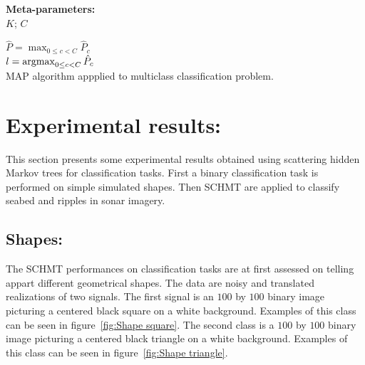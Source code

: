 \documentclass[a4paper,11pt]{report}
\begin{document}
		\begin{center}
			\begin{algorithm}
				\textbf{Meta-parameters:}\\
					$K$; $C$ 
					
				
				$\hat{P}= \max_{0\leq c < C} \hat{P}_{c}$\\
				$l= \mathop{\rm argmax}_{0\leq c < C} \hat{P}_{c}$\\
				
				\caption{MAP algorithm appplied to multiclass classification problem.}
				\label{algo:MAP clf}
			\end{algorithm}        
		\end{center}
    
\chapter{Experimental results:}
  \label{chap:Exp}
  This section presents some experimental results obtained using scattering hidden Markov trees for classification tasks. First a binary classification task is performed on simple simulated shapes. Then SCHMT are applied to classify seabed and ripples in sonar imagery.
  
  \section{Shapes:}
		\label{sec:Exp/Shape:}
		
		The SCHMT performances on classification tasks are at first assessed on telling appart different geometrical shapes. The data are noisy and translated realizations of two signals. The first signal is an $100$ by $100$ binary image picturing a centered black square on a white background. Examples of this class can be seen in figure~\ref{fig:Shape square}. The second class is a $100$ by $100$ binary image picturing a centered black triangle on a white background. Examples of this class can be seen in figure~\ref{fig:Shape triangle}. 
		
\end{document}
